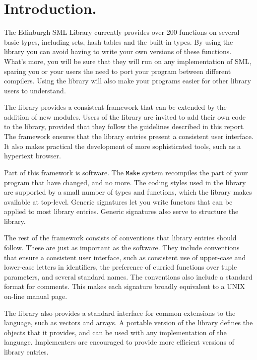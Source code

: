 %
%
%

\chapter{Introduction.}

The Edinburgh SML Library currently provides over 200 functions
on several basic types, including sets, hash tables and the built-in types.
By using the library you can avoid having to
write your own versions of these functions.  What's more, you will be
sure that they will run on any implementation of SML, sparing you or your
users the need to port your program between different compilers.  Using
the library will also make your programs easier for other library users
to understand.

The library provides a consistent framework that can be extended by
the addition of new modules.  Users of the library are invited to
add their own code to the library, provided that they follow the
guidelines described in this report.  The framework ensures that the
library entries present a consistent user interface.  It also makes
practical the development of more sophisticated tools, such as a
hypertext browser.

Part of this framework is software.
The {\tt Make} system recompiles
the part of your program that have changed, and no more. The coding styles
used in the library are supported by a small number of types and functions,
which the library makes available at top-level. Generic signatures let
you write functors that can be applied to most library entries.
Generic signatures also serve to structure the library.

The rest of the framework consists of conventions that library entries
should follow. These are just as important as the software. They include
conventions that ensure a consistent user interface, such as consistent
use of upper-case and lower-case letters in identifiers, the preference of
curried functions over tuple parameters, and several standard names.
The conventions also include a standard format for comments. This makes
each signature broadly equivalent to a UNIX on-line manual page.

The library also provides a standard interface for
common extensions to the language, such as vectors and arrays.
A portable version of the library defines the objects that
it provides, and can be used with any implementation of the language.
Implementers are encouraged to provide more efficient versions
of library entries.


